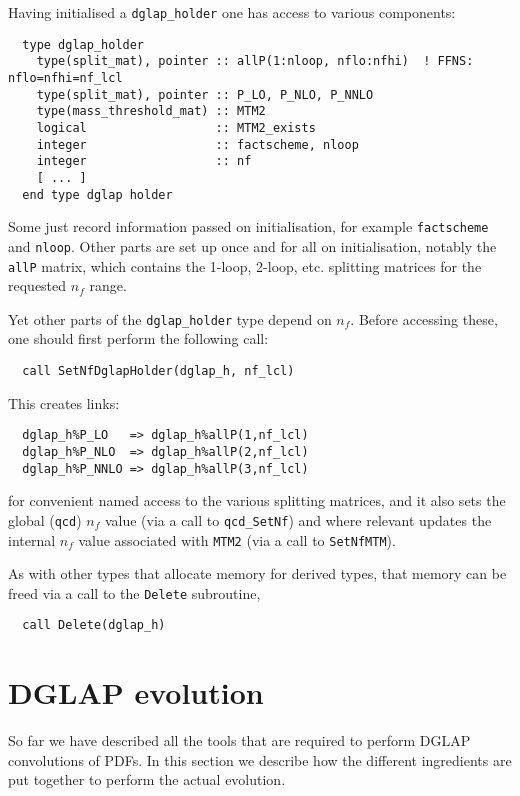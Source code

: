 \documentclass[12pt]{article}
\newcommand{\ttt}[1]{\texttt{#1}}
\begin{document}
Having initialised a \ttt{dglap\_holder} one has access to various components:
\begin{lstlisting}
  type dglap_holder
    type(split_mat), pointer :: allP(1:nloop, nflo:nfhi)  ! FFNS: nflo=nfhi=nf_lcl
    type(split_mat), pointer :: P_LO, P_NLO, P_NNLO
    type(mass_threshold_mat) :: MTM2
    logical                  :: MTM2_exists
    integer                  :: factscheme, nloop
    integer                  :: nf
    [ ... ]
  end type dglap holder
\end{lstlisting}
Some just record information passed on initialisation, for example
\ttt{factscheme} and \ttt{nloop}. Other parts are set up once and for
all on initialisation, notably the \ttt{allP} matrix, which contains
the 1-loop, 2-loop, etc. splitting matrices for the requested $n_f$
range.

Yet other parts of the \ttt{dglap\_holder} type depend on $n_f$.
Before accessing these, one should first perform the following call:
\begin{lstlisting}
  call SetNfDglapHolder(dglap_h, nf_lcl)
\end{lstlisting}
This creates links:
\begin{lstlisting}
  dglap_h%P_LO   => dglap_h%allP(1,nf_lcl)
  dglap_h%P_NLO  => dglap_h%allP(2,nf_lcl)
  dglap_h%P_NNLO => dglap_h%allP(3,nf_lcl)
\end{lstlisting}
for convenient named access to the various splitting matrices, and it
also sets the global (\ttt{qcd}) $n_f$ value (via a call to
\ttt{qcd\_SetNf}) and where relevant updates the internal $n_f$ value
associated with \ttt{MTM2} (via a call to \ttt{SetNfMTM}).

As with other types that allocate memory for derived types, that
memory can be freed via a call to the \ttt{Delete} subroutine,
\begin{lstlisting}
  call Delete(dglap_h)
\end{lstlisting}

\section{DGLAP evolution}
So far we have described all the tools that are required
to perform  DGLAP convolutions of PDFs. In this section
we describe how the different ingredients are put together
to perform the actual evolution.


\end{document}
